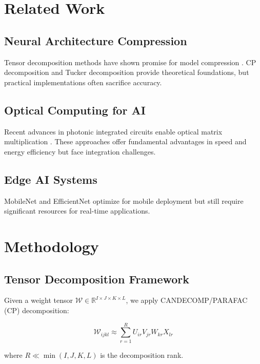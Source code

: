 \documentclass[10pt,twocolumn,letterpaper]{article}
\begin{document}
\section{Related Work}
\label{sec:related}

\subsection{Neural Architecture Compression}
Tensor decomposition methods have shown promise for model compression \cite{novikov2022tensor}. CP decomposition \cite{kolda2009tensor} and Tucker decomposition \cite{tucker1966} provide theoretical foundations, but practical implementations often sacrifice accuracy.

\subsection{Optical Computing for AI}
Recent advances in photonic integrated circuits enable optical matrix multiplication \cite{feldmann2023photonic, shen2023optical}. These approaches offer fundamental advantages in speed and energy efficiency but face integration challenges.

\subsection{Edge AI Systems}
MobileNet \cite{howard2017mobilenet} and EfficientNet \cite{tan2019efficientnet} optimize for mobile deployment but still require significant resources for real-time applications.

\section{Methodology}
\label{sec:methodology}

\subsection{Tensor Decomposition Framework}

Given a weight tensor $\mathbf{\mathcal{W}} \in \mathbb{R}^{I \times J \times K \times L}$, we apply CANDECOMP/PARAFAC (CP) decomposition:

\begin{equation}
\label{eq:cp_decomp}
\mathcal{W}_{ijkl} \approx \sum_{r=1}^{R} U_{ir} V_{jr} W_{kr} X_{lr}
\end{equation}

where $R \ll \min(I,J,K,L)$ is the decomposition rank.
\end{document}
